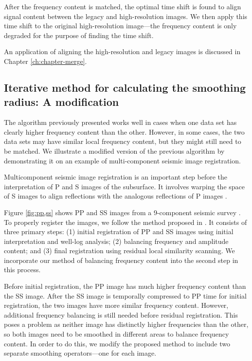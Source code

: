         After the frequency content is matched, the optimal time shift is found to align signal content between the legacy and high-resolution images. We then apply this time shift to the original high-resolution image---the frequency content is only degraded for the purpose of finding the time shift. 
        
        An application of aligning the high-resolution and legacy images is discussed in Chapter \ref{ch:chapter-merge}.


\subsection{Iterative method for calculating the smoothing radius: A modification}
        The algorithm previously presented works well in cases when one data set has clearly higher frequency content than the other.
        However, in some cases, the two data sets may have similar local frequency content, but they might still need to be matched.
        We illustrate a modified version of the previous algorithm by demonstrating it on an example of multi-component seismic image registration.

        Multicomponent seismic image registration is an important step before the interpretation of P and S images of the subsurface. It involves warping the space of S images to align reflections with the analogous reflections of P images \cite[]{fomel2003,warp}.

        Figure \ref{fig:pp,ss} shows PP and SS images from a 9-component seismic survey \cite[]{attr}.
        To properly register the images, we follow the method proposed in \cite{warp}. 
        It consists of three primary steps: (1) initial registration of PP and SS images using initial interpretation and well-log analysis; (2) balancing frequency and amplitude content; and (3) final registration using residual local similarity scanning. 
        We incorporate our method of balancing frequency content into the second step in this process.

        Before initial registration, the PP image has much higher frequency content than the SS image. 
        After the SS image is temporally compressed to PP time for initial registration, the two images have more similar frequency content. 
        However, additional frequency balancing is still needed before residual registration. 
        This poses a problem as neither image has distinctly higher frequencies than the other, so both images need to be smoothed in different areas to balance frequency content. 
        In order to do this, we modify the proposed method to include two separate smoothing operators---one for each image.

